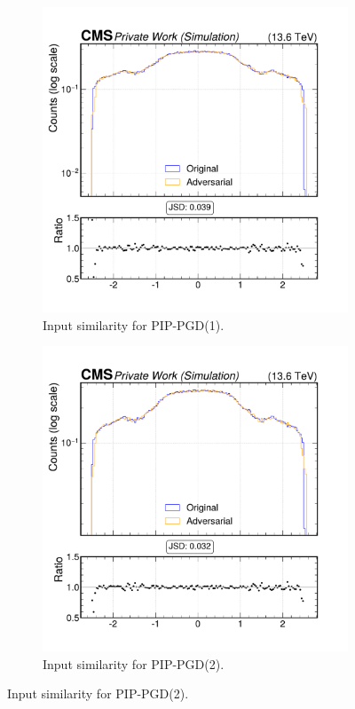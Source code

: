\begin{figure}[htbp]
  \centering
  \begin{subfigure}[t]{0.5\textwidth}
    \includegraphics[width=\linewidth]{media/output/features/compare/combined_it_1/cmp_global_features_jet_eta.pdf}
    \caption{Input similarity for PIP-PGD(1).}
    \label{fig:left}
  \end{subfigure}\hfill
  \begin{subfigure}[t]{0.5\textwidth}
    \includegraphics[width=\linewidth]{media/output/features/compare/combined_it_2/cmp_global_features_jet_eta.pdf}
    \caption{Input similarity for PIP-PGD(2).}
    \label{fig:middle}
  \end{subfigure}\hfill


\end{figure}

